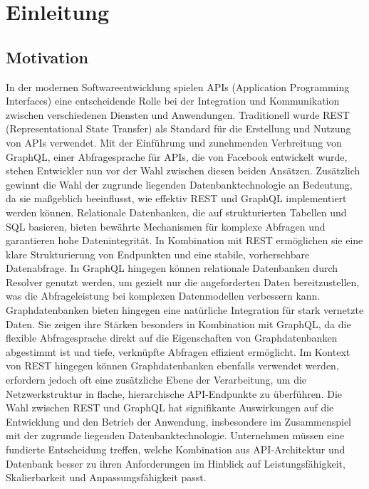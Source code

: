 \chapter{Einleitung} %
\label{sec:einleitung}
\section{Motivation} %
\label{sec:motivation}
In der modernen Softwareentwicklung spielen APIs (Application Programming Interfaces) eine entscheidende Rolle bei der Integration und Kommunikation zwischen verschiedenen Diensten und Anwendungen. Traditionell wurde REST (Representational State Transfer) als Standard für die Erstellung und Nutzung von APIs verwendet. Mit der Einführung und zunehmenden Verbreitung von GraphQL, einer Abfragesprache für APIs, die von Facebook entwickelt wurde, stehen Entwickler nun vor der Wahl zwischen diesen beiden Ansätzen.
Zusätzlich gewinnt die Wahl der zugrunde liegenden Datenbanktechnologie an Bedeutung, da sie maßgeblich beeinflusst, wie effektiv REST und GraphQL implementiert werden können. Relationale Datenbanken, die auf strukturierten Tabellen und SQL basieren, bieten bewährte Mechanismen für komplexe Abfragen und garantieren hohe Datenintegrität. In Kombination mit REST ermöglichen sie eine klare Strukturierung von Endpunkten und eine stabile, vorhersehbare Datenabfrage. In GraphQL hingegen können relationale Datenbanken durch Resolver genutzt werden, um gezielt nur die angeforderten Daten bereitzustellen, was die Abfrageleistung bei komplexen Datenmodellen verbessern kann.
Graphdatenbanken bieten hingegen eine natürliche Integration für stark vernetzte Daten. Sie zeigen ihre Stärken besonders in Kombination mit GraphQL, da die flexible Abfragesprache direkt auf die Eigenschaften von Graphdatenbanken abgestimmt ist und tiefe, verknüpfte Abfragen effizient ermöglicht. Im Kontext von REST hingegen können Graphdatenbanken ebenfalls verwendet werden, erfordern jedoch oft eine zusätzliche Ebene der Verarbeitung, um die Netzwerkstruktur in flache, hierarchische API-Endpunkte zu überführen. Die Wahl zwischen REST und GraphQL hat signifikante Auswirkungen auf die Entwicklung und den Betrieb der Anwendung, insbesondere im Zusammenspiel mit der zugrunde liegenden Datenbanktechnologie. Unternehmen müssen eine fundierte Entscheidung treffen, welche Kombination aus API-Architektur und Datenbank besser zu ihren Anforderungen im Hinblick auf Leistungsfähigkeit, Skalierbarkeit und Anpassungsfähigkeit passt.
\newpage
